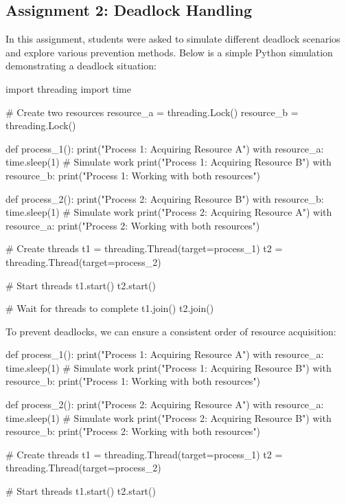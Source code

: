 \documentclass[12pt]{article}
\begin{document}
\begin{itemize}
\subsection{Assignment 2: Deadlock Handling}
In this assignment, students were asked to simulate different deadlock scenarios and explore various prevention methods. Below is a simple Python simulation demonstrating a deadlock situation:

\begin{python}
import threading
import time

# Create two resources
resource_a = threading.Lock()
resource_b = threading.Lock()

def process_1():
    print("Process 1: Acquiring Resource A")
    with resource_a:
        time.sleep(1)  # Simulate work
        print("Process 1: Acquiring Resource B")
        with resource_b:
            print("Process 1: Working with both resources")

def process_2():
    print("Process 2: Acquiring Resource B")
    with resource_b:
        time.sleep(1)  # Simulate work
        print("Process 2: Acquiring Resource A")
        with resource_a:
            print("Process 2: Working with both resources")

# Create threads
t1 = threading.Thread(target=process_1)
t2 = threading.Thread(target=process_2)

# Start threads
t1.start()
t2.start()

# Wait for threads to complete
t1.join()
t2.join()
\end{python}

To prevent deadlocks, we can ensure a consistent order of resource acquisition:

\begin{python}
def process_1():
    print("Process 1: Acquiring Resource A")
    with resource_a:
        time.sleep(1)  # Simulate work
        print("Process 1: Acquiring Resource B")
        with resource_b:
            print("Process 1: Working with both resources")

def process_2():
    print("Process 2: Acquiring Resource A")
    with resource_a:
        time.sleep(1)  # Simulate work
        print("Process 2: Acquiring Resource B")
        with resource_b:
            print("Process 2: Working with both resources")

# Create threads
t1 = threading.Thread(target=process_1)
t2 = threading.Thread(target=process_2)

# Start threads
t1.start()
t2.start()


\end{python}
\end{itemize}
\end{document}
